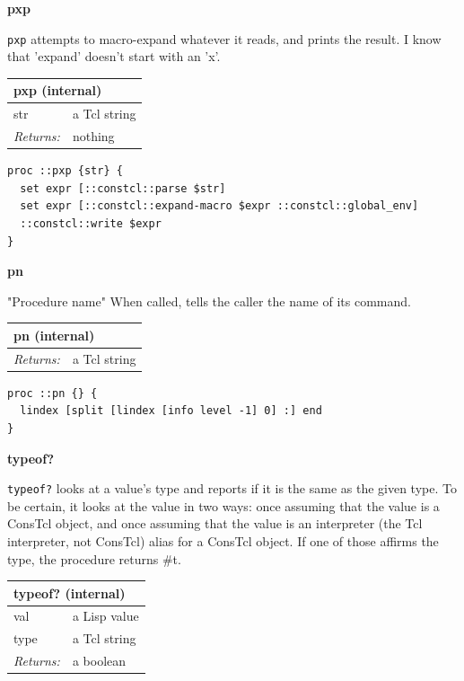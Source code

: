 \documentclass[twoside,9pt]{report}
\begin{document}
\textbf{pxp}


\texttt{pxp} attempts to macro-expand whatever it reads, and prints the result. I know that 'expand' doesn't start with an 'x'.

\begin{tabular}{ |l l| }
\hline
\multicolumn{2}{|l|}{pxp (internal)} \\
\hline
str & a Tcl string \\
\textit{Returns:} & nothing \\
\hline
\end{tabular}

\noindent\makebox[\linewidth]{\rule{\linewidth}{0.4pt}}
\begin{lstlisting}
proc ::pxp {str} {
  set expr [::constcl::parse $str]
  set expr [::constcl::expand-macro $expr ::constcl::global_env]
  ::constcl::write $expr
}
\end{lstlisting}
\noindent\makebox[\linewidth]{\rule{\linewidth}{0.4pt}}

\textbf{pn}


"Procedure name" When called, tells the caller the name of its command.

\begin{tabular}{ |l l| }
\hline
\multicolumn{2}{|l|}{pn (internal)} \\
\hline
\textit{Returns:} & a Tcl string \\
\hline
\end{tabular}

\noindent\makebox[\linewidth]{\rule{\linewidth}{0.4pt}}
\begin{lstlisting}
proc ::pn {} {
  lindex [split [lindex [info level -1] 0] :] end
}
\end{lstlisting}
\noindent\makebox[\linewidth]{\rule{\linewidth}{0.4pt}}

\textbf{typeof?}


\texttt{typeof?} looks at a value's type and reports if it is the same as the given type. To be certain, it looks at the value in two ways: once assuming that the value is a ConsTcl object, and once assuming that the value is an interpreter (the Tcl interpreter, not ConsTcl) alias for a ConsTcl object. If one of those affirms the type, the procedure returns \#t.

\begin{tabular}{ |l l| }
\hline
\multicolumn{2}{|l|}{typeof? (internal)} \\
\hline
val & a Lisp value \\
type & a Tcl string \\
\textit{Returns:} & a boolean \\
\hline
\end{tabular}
\end{document}
